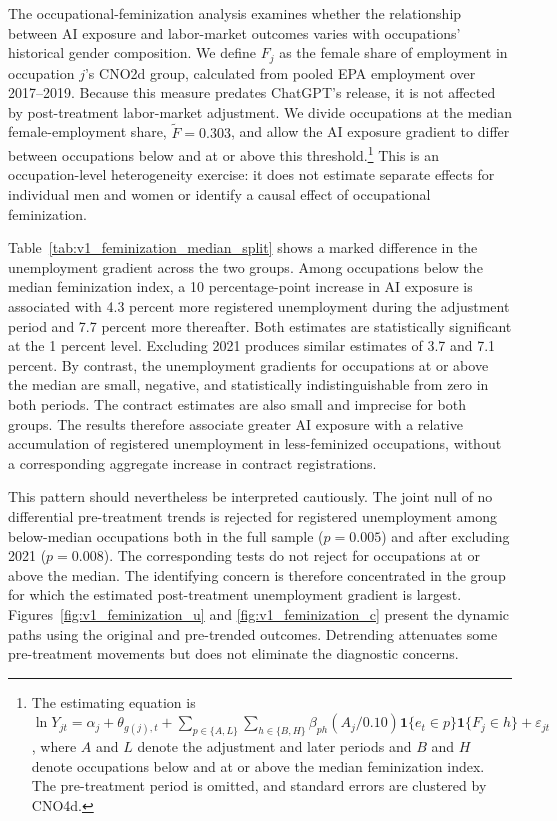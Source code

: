 \documentclass[11pt]{article}
\newcommand{\figdir}{uploads/figuresNtables}
\begin{document}
The occupational-feminization analysis examines whether the relationship between AI exposure and labor-market outcomes varies with occupations' historical gender composition. We define \(F_j\) as the female share of employment in occupation \(j\)'s CNO2d group, calculated from pooled EPA employment over 2017--2019. Because this measure predates ChatGPT's release, it is not affected by post-treatment labor-market adjustment. We divide occupations at the median female-employment share, \(\widetilde F=0.303\), and allow the AI exposure gradient to differ between occupations below and at or above this threshold.\footnote{The estimating equation is \(\ln Y_{jt}=\alpha_j+\theta_{g(j),t}+\sum_{p\in\{A,L\}}\sum_{h\in\{B,H\}}\beta_{ph}(A_j/0.10)\mathbf{1}\{e_t\in p\}\mathbf{1}\{F_j\in h\}+\varepsilon_{jt}\), where \(A\) and \(L\) denote the adjustment and later periods and \(B\) and \(H\) denote occupations below and at or above the median feminization index. The pre-treatment period is omitted, and standard errors are clustered by CNO4d.} This is an occupation-level heterogeneity exercise: it does not estimate separate effects for individual men and women or identify a causal effect of occupational feminization.



Table~\ref{tab:v1_feminization_median_split} shows a marked difference in the unemployment gradient across the two groups. Among occupations below the median feminization index, a 10 percentage-point increase in AI exposure is associated with 4.3 percent more registered unemployment during the adjustment period and 7.7 percent more thereafter. Both estimates are statistically significant at the 1 percent level. Excluding 2021 produces similar estimates of 3.7 and 7.1 percent. By contrast, the unemployment gradients for occupations at or above the median are small, negative, and statistically indistinguishable from zero in both periods. The contract estimates are also small and imprecise for both groups. The results therefore associate greater AI exposure with a relative accumulation of registered unemployment in less-feminized occupations, without a corresponding aggregate increase in contract registrations.

This pattern should nevertheless be interpreted cautiously. The joint null of no differential pre-treatment trends is rejected for registered unemployment among below-median occupations both in the full sample (\(p=0.005\)) and after excluding 2021 (\(p=0.008\)). The corresponding tests do not reject for occupations at or above the median. The identifying concern is therefore concentrated in the group for which the estimated post-treatment unemployment gradient is largest. Figures~\ref{fig:v1_feminization_u} and \ref{fig:v1_feminization_c} present the dynamic paths using the original and pre-trended outcomes. Detrending attenuates some pre-treatment movements but does not eliminate the diagnostic concerns.
\end{document}
